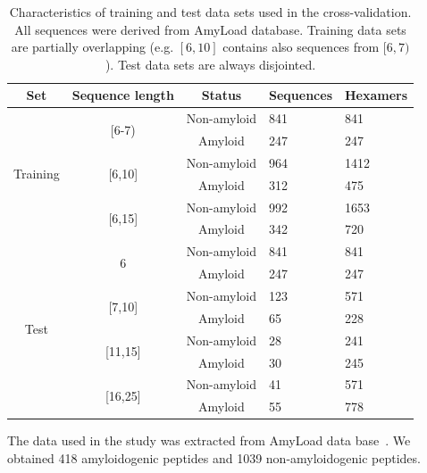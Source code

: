\documentclass[fleqn,10pt,twoside]{gcb15submission}
\begin{document}
\begin{table}[h]
\centering
\small
\caption{Characteristics of training and test data sets used in the 
cross-validation. All sequences were derived from AmyLoad database. Training 
data sets are partially overlapping (e.g. $[6, 10]$ contains also sequences 
from $[6, 7)$). Test data sets are always disjointed.}
\label{tab:data_sets}
\begin{tabular}{cccll}
\toprule
Set & Sequence length & Status & Sequences & Hexamers \\ 
\midrule
\multirow{6}{*}{Training} & \multirow{2}{*}{[6-7)} & Non-amyloid & 841 & 841 
\\
 &  & \cellcolor[gray]{0.85}Amyloid & \cellcolor[gray]{0.85}247 & 
\cellcolor[gray]{0.85}247 \\
 \cline{2-5}
 & \multirow{2}{*}{{[}6,10{]}} & Non-amyloid & 964 & 1412 \\
 &  & \cellcolor[gray]{0.85}Amyloid & \cellcolor[gray]{0.85}312 & 
\cellcolor[gray]{0.85}475 \\
 \cline{2-5}
 & \multirow{2}{*}{{[}6,15{]}} & Non-amyloid & 992 & 1653 \\
 &  & \cellcolor[gray]{0.85}Amyloid & \cellcolor[gray]{0.85}342 & 
\cellcolor[gray]{0.85}720 \\
 \hline
 \hline
\multirow{8}{*}{Test} & \multirow{2}{*}{6} & Non-amyloid & 841 & 841 \\
 &  & \cellcolor[gray]{0.85}Amyloid & \cellcolor[gray]{0.85}247 & 
\cellcolor[gray]{0.85}247 \\
 \cline{2-5}
 & \multirow{2}{*}{{[}7,10{]}} & Non-amyloid & 123 & 571 \\
 &  & \cellcolor[gray]{0.85}Amyloid & \cellcolor[gray]{0.85}65 & 
\cellcolor[gray]{0.85}228 \\
 \cline{2-5}
 & \multirow{2}{*}{{[}11,15{]}} & Non-amyloid & 28 & 241 \\
 &  & \cellcolor[gray]{0.85}Amyloid & \cellcolor[gray]{0.85}30 & 
\cellcolor[gray]{0.85}245 \\
 \cline{2-5}
 & \multirow{2}{*}{{[}16,25{]}} & Non-amyloid & 41 & 571 \\
 &  & \cellcolor[gray]{0.85}Amyloid & \cellcolor[gray]{0.85}55 & 
\cellcolor[gray]{0.85}778 \\
 \bottomrule
\end{tabular}
\end{table}

The data used in the study was extracted from AmyLoad data 
base~\citep{wozniak_amyload:_2015}. We obtained 418 amyloidogenic peptides and 
1039 non-amyloidogenic peptides.
\end{document}
